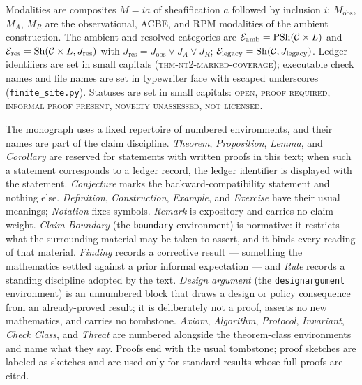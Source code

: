 \begin{notation}\label{ch01:not:project}
Modalities are composites $M = i a$ of sheafification $a$ followed by
inclusion $i$; $M_{\mathrm{obs}}$, $M_A$, $M_R$ are the observational,
ACBE, and RPM modalities of the ambient construction. The ambient and
resolved categories are $\mathcal{E}_{\mathrm{amb}} = \mathrm{PSh}(\mathcal{C} \times L)$
and $\mathcal{E}_{\mathrm{res}} = \mathrm{Sh}(\mathcal{C} \times L, J_{\mathrm{res}})$
with $J_{\mathrm{res}} = J_{\mathrm{obs}} \vee J_A \vee J_R$;
$\mathcal{E}_{\mathrm{legacy}} = \mathrm{Sh}(\mathcal{C}, J_{\mathrm{legacy}})$. Ledger
identifiers are set in small capitals (\textsc{thm-nt2-marked-coverage});
executable check names and file names are set in typewriter face with
escaped underscores (\texttt{finite\_site.py}). Statuses are set in small
capitals: \textsc{open}, \textsc{proof required}, \textsc{informal proof
present}, \textsc{novelty unassessed}, \textsc{not licensed}.
\end{notation}

\begin{notation}\label{ch01:not:environments}
The monograph uses a fixed repertoire of numbered environments, and their
names are part of the claim discipline. \emph{Theorem}, \emph{Proposition},
\emph{Lemma}, and \emph{Corollary} are reserved for statements with written
proofs in this text; when such a statement corresponds to a ledger record,
the ledger identifier is displayed with the statement. \emph{Conjecture}
marks the backward-compatibility statement and nothing else.
\emph{Definition}, \emph{Construction}, \emph{Example}, and
\emph{Exercise} have their usual meanings; \emph{Notation} fixes symbols.
\emph{Remark} is expository and carries no claim weight. \emph{Claim
Boundary} (the \texttt{boundary} environment) is normative: it restricts
what the surrounding material may be taken to assert, and it binds every
reading of that material. \emph{Finding} records a corrective result ---
something the mathematics settled against a prior informal expectation ---
and \emph{Rule} records a standing discipline adopted by the text.
\emph{Design argument} (the \texttt{designargument} environment) is an
unnumbered block that draws a design or policy consequence from an
already-proved result; it is deliberately not a proof, asserts no new
mathematics, and carries no tombstone. \emph{Axiom}, \emph{Algorithm},
\emph{Protocol}, \emph{Invariant}, \emph{Check Class}, and \emph{Threat} are
numbered alongside the theorem-class environments and name what they say.
Proofs end with the usual tombstone; proof sketches are labeled as
sketches and are used only for standard results whose full proofs are
cited.
\end{notation}

